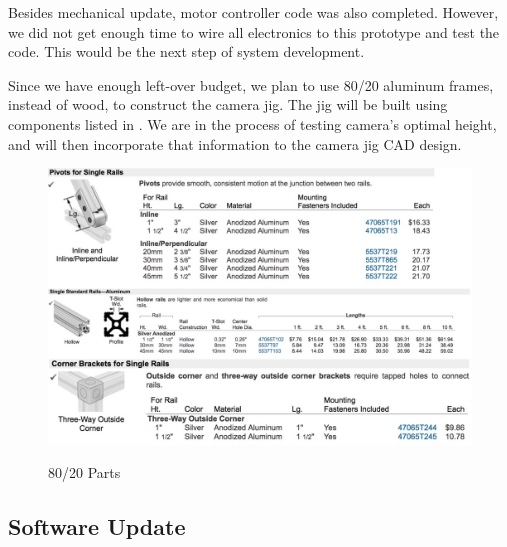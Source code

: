 Besides mechanical update, motor controller code was also completed. However, we did not get enough time to wire all electronics to this prototype and test the code. This would be the next step of system development. 

Since we have enough left-over budget, we plan to use 80/20 aluminum frames, instead of wood, to construct the camera jig. The jig will be built using components listed in . We are in the process of testing camera’s optimal height, and will then incorporate that information to the camera jig CAD design. 

\begin{figure}[h!]
\centering
\includegraphics[width=0.98\columnwidth]{CAD/8020.jpeg}
\label{fig:em4}
\caption{80/20 Parts}
\end{figure}

\subsection{Software Update}
\label{sec:software_progress}
